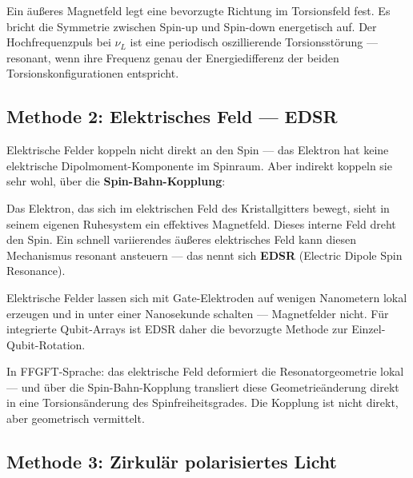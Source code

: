 \begin{keypoint}
Ein äußeres Magnetfeld legt eine bevorzugte Richtung
im Torsionsfeld fest. Es bricht die Symmetrie zwischen
Spin-up und Spin-down energetisch auf.
Der Hochfrequenzpuls bei $\nu_L$ ist eine periodisch
oszillierende Torsionsstörung --- resonant, wenn ihre
Frequenz genau der Energiedifferenz der beiden
Torsionskonfigurationen entspricht.
\end{keypoint}

\subsection{Methode 2: Elektrisches Feld --- EDSR}
\label{sec:edsr}

Elektrische Felder koppeln nicht direkt an den Spin ---
das Elektron hat keine elektrische Dipolmoment-Komponente
im Spinraum. Aber indirekt koppeln sie sehr wohl,
über die \textbf{Spin-Bahn-Kopplung}:

Das Elektron, das sich im elektrischen Feld des Kristallgitters
bewegt, sieht in seinem eigenen Ruhesystem ein effektives
Magnetfeld. Dieses interne Feld dreht den Spin.
Ein schnell variierendes äußeres elektrisches Feld
kann diesen Mechanismus resonant ansteuern ---
das nennt sich \textbf{EDSR} (Electric Dipole Spin Resonance).

\begin{important}
Elektrische Felder lassen sich mit Gate-Elektroden
auf wenigen Nanometern lokal erzeugen und in unter
einer Nanosekunde schalten --- Magnetfelder nicht.
Für integrierte Qubit-Arrays ist EDSR daher die
bevorzugte Methode zur Einzel-Qubit-Rotation.
\end{important}

In FFGFT-Sprache: das elektrische Feld deformiert
die Resonatorgeometrie lokal --- und über die
Spin-Bahn-Kopplung transliert diese Geometrieänderung
direkt in eine Torsionsänderung des Spinfreiheitsgrades.
Die Kopplung ist nicht direkt, aber geometrisch vermittelt.

\subsection{Methode 3: Zirkulär polarisiertes Licht}
\label{sec:optisch}

